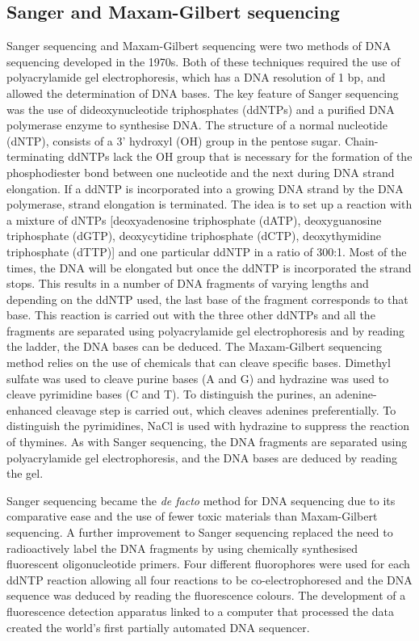\subsection{Sanger and Maxam-Gilbert sequencing}

Sanger sequencing\cite{pmid271968} and Maxam-Gilbert sequencing\cite{pmid265521} were two methods of DNA sequencing developed in the 1970s. Both of these techniques required the use of polyacrylamide gel electrophoresis, which has a DNA resolution of 1 bp, and allowed the determination of DNA bases. The key feature of Sanger sequencing was the use of dideoxynucleotide triphosphates (ddNTPs) and a purified DNA polymerase enzyme to synthesise DNA. The structure of a normal nucleotide (dNTP), consists of a 3' hydroxyl (OH) group in the pentose sugar. Chain-terminating ddNTPs lack the OH group that is necessary for the formation of the phosphodiester bond between one nucleotide and the next during DNA strand elongation. If a ddNTP is incorporated into a growing DNA strand by the DNA polymerase, strand elongation is terminated. The idea is to set up a reaction with a mixture of dNTPs [deoxyadenosine triphosphate (dATP), deoxyguanosine triphosphate (dGTP), deoxycytidine triphosphate (dCTP), deoxythymidine triphosphate (dTTP)] and one particular ddNTP in a ratio of 300:1. Most of the times, the DNA will be elongated but once the ddNTP is incorporated the strand stops. This results in a number of DNA fragments of varying lengths and depending on the ddNTP used, the last base of the fragment corresponds to that base. This reaction is carried out with the three other ddNTPs and all the fragments are separated using polyacrylamide gel electrophoresis and by reading the ladder, the DNA bases can be deduced. The Maxam-Gilbert sequencing method relies on the use of chemicals that can cleave specific bases. Dimethyl sulfate was used to cleave purine bases (A and G) and hydrazine was used to cleave pyrimidine bases (C and T). To distinguish the purines, an adenine-enhanced cleavage step is carried out, which cleaves adenines preferentially. To distinguish the pyrimidines, NaCl is used with hydrazine to suppress the reaction of thymines. As with Sanger sequencing, the DNA fragments are separated using polyacrylamide gel electrophoresis, and the DNA bases are deduced by reading the gel.

Sanger sequencing became the \textit{de facto} method for DNA sequencing due to its comparative ease and the use of fewer toxic materials than Maxam-Gilbert sequencing. A further improvement to Sanger sequencing replaced the need to radioactively label the DNA fragments by using chemically synthesised fluorescent oligonucleotide primers\cite{pmid3713851}. Four different fluorophores were used for each ddNTP reaction allowing all four reactions to be co-electrophoresed and the DNA sequence was deduced by reading the fluorescence colours. The development of a fluorescence detection apparatus linked to a computer that processed the data created the world's first partially automated DNA sequencer\cite{pmid3713851}.

